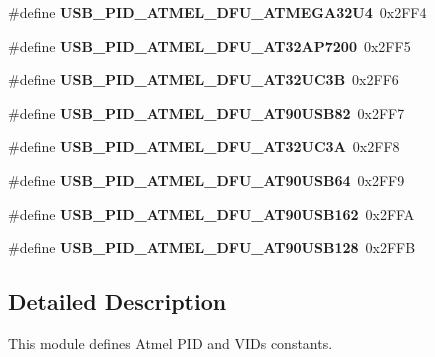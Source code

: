 \begin{DoxyCompactItemize}
\item 
\hypertarget{group__usb__atmel__ids__group_gacc8564e7fe5ed97397f9e29bb1dd1da6}{\#define {\bfseries U\-S\-B\-\_\-\-P\-I\-D\-\_\-\-A\-T\-M\-E\-L\-\_\-\-D\-F\-U\-\_\-\-A\-T\-M\-E\-G\-A32\-U4}~0x2\-F\-F4}\label{group__usb__atmel__ids__group_gacc8564e7fe5ed97397f9e29bb1dd1da6}

\item 
\hypertarget{group__usb__atmel__ids__group_gab964ea6d7b5cd446503f1cfd117c6fb7}{\#define {\bfseries U\-S\-B\-\_\-\-P\-I\-D\-\_\-\-A\-T\-M\-E\-L\-\_\-\-D\-F\-U\-\_\-\-A\-T32\-A\-P7200}~0x2\-F\-F5}\label{group__usb__atmel__ids__group_gab964ea6d7b5cd446503f1cfd117c6fb7}

\item 
\hypertarget{group__usb__atmel__ids__group_ga269e2728ce539d20958aa5f2585b66f6}{\#define {\bfseries U\-S\-B\-\_\-\-P\-I\-D\-\_\-\-A\-T\-M\-E\-L\-\_\-\-D\-F\-U\-\_\-\-A\-T32\-U\-C3\-B}~0x2\-F\-F6}\label{group__usb__atmel__ids__group_ga269e2728ce539d20958aa5f2585b66f6}

\item 
\hypertarget{group__usb__atmel__ids__group_gadfe12f6d5db92d6fafd65581533f2280}{\#define {\bfseries U\-S\-B\-\_\-\-P\-I\-D\-\_\-\-A\-T\-M\-E\-L\-\_\-\-D\-F\-U\-\_\-\-A\-T90\-U\-S\-B82}~0x2\-F\-F7}\label{group__usb__atmel__ids__group_gadfe12f6d5db92d6fafd65581533f2280}

\item 
\hypertarget{group__usb__atmel__ids__group_ga90c652420209632cdaf35e052c2a150f}{\#define {\bfseries U\-S\-B\-\_\-\-P\-I\-D\-\_\-\-A\-T\-M\-E\-L\-\_\-\-D\-F\-U\-\_\-\-A\-T32\-U\-C3\-A}~0x2\-F\-F8}\label{group__usb__atmel__ids__group_ga90c652420209632cdaf35e052c2a150f}

\item 
\hypertarget{group__usb__atmel__ids__group_ga42a899ba4187b397c1d7aaf0e5c51a17}{\#define {\bfseries U\-S\-B\-\_\-\-P\-I\-D\-\_\-\-A\-T\-M\-E\-L\-\_\-\-D\-F\-U\-\_\-\-A\-T90\-U\-S\-B64}~0x2\-F\-F9}\label{group__usb__atmel__ids__group_ga42a899ba4187b397c1d7aaf0e5c51a17}

\item 
\hypertarget{group__usb__atmel__ids__group_ga9819f0f192d21296c7e548d6fb59ec32}{\#define {\bfseries U\-S\-B\-\_\-\-P\-I\-D\-\_\-\-A\-T\-M\-E\-L\-\_\-\-D\-F\-U\-\_\-\-A\-T90\-U\-S\-B162}~0x2\-F\-F\-A}\label{group__usb__atmel__ids__group_ga9819f0f192d21296c7e548d6fb59ec32}

\item 
\hypertarget{group__usb__atmel__ids__group_ga7cdcdd407742dfa62250a4120c95ed0b}{\#define {\bfseries U\-S\-B\-\_\-\-P\-I\-D\-\_\-\-A\-T\-M\-E\-L\-\_\-\-D\-F\-U\-\_\-\-A\-T90\-U\-S\-B128}~0x2\-F\-F\-B}\label{group__usb__atmel__ids__group_ga7cdcdd407742dfa62250a4120c95ed0b}

\end{DoxyCompactItemize}


\subsection{Detailed Description}
This module defines Atmel P\-I\-D and V\-I\-Ds constants. 